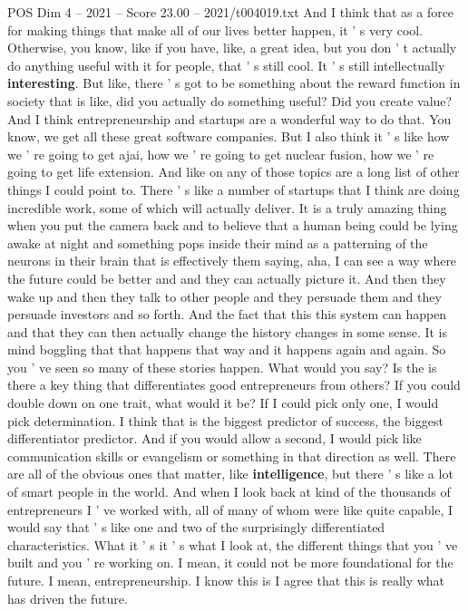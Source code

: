 \begin{textsample}{POS Dim 4 – 2021 – Score 23.00 – 2021/t004019.txt}
And I think that as a force for making things that make all of our lives better happen, it ' s very cool.
Otherwise, you know, like if you have, like, a great idea, but you don ' t actually do anything useful with it for people, that ' s still cool.
It ' s still intellectually \textbf{interesting}.
But like, there ' s got to be something about the reward function in society that is like, did you actually do something useful?
Did you create value?
And I think entrepreneurship and startups are a wonderful way to do that.
You know, we get all these great software companies.
But I also think it ' s like how we ' re going to get ajai, how we ' re going to get nuclear fusion, how we ' re going to get life extension.
And like on any of those topics are a long list of other things I could point to.
There ' s like a number of startups that I think are doing incredible work, some of which will actually deliver.
It is a truly amazing thing when you put the camera back and to believe that a human being could be lying awake at night and something pops inside their mind as a patterning of the neurons in their brain that is effectively them saying, aha, I can see a way where the future could be better and and they can actually picture it.
And then they wake up and then they talk to other people and they persuade them and they persuade investors and so forth.
And the fact that this this system can happen and that they can then actually change the history changes in some sense.
It is mind boggling that that happens that way and it happens again and again.
So you ' ve seen so many of these stories happen.
What would you say?
Is the is there a key thing that differentiates good entrepreneurs from others?
If you could double down on one trait, what would it be?
If I could pick only one, I would pick determination.
I think that is the biggest predictor of success, the biggest differentiator predictor.
And if you would allow a second, I would pick like communication skills or evangelism or something in that direction as well.
There are all of the obvious ones that matter, like \textbf{intelligence}, but there ' s like a lot of smart people in the world.
And when I look back at kind of the thousands of entrepreneurs I ' ve worked with, all of many of whom were like quite capable, I would say that ' s like one and two of the surprisingly differentiated characteristics.
What it ' s it ' s what I look at, the different things that you ' ve built and you ' re working on.
I mean, it could not be more foundational for the future.
I mean, entrepreneurship.
I know this is I agree that this is really what has driven the future.

\end{textsample}
